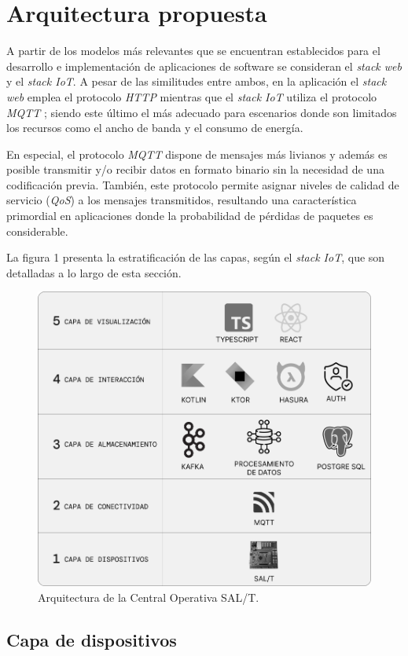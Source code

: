 
\captionsetup[figure]{font=small}


\section{Arquitectura propuesta}

A partir de los modelos más relevantes que se encuentran establecidos para el desarrollo e implementación de aplicaciones de software se consideran el \textit{stack web} y el \textit{stack IoT}. A pesar de las similitudes entre ambos, en la aplicación el \textit{stack web} emplea el protocolo \textit{HTTP} \cite{b5} mientras que el \textit{stack IoT} utiliza el protocolo \textit{MQTT} \cite{b6}; siendo este último el más adecuado para escenarios donde son limitados los recursos como el ancho de banda y el consumo de energía.

En especial, el protocolo \textit{MQTT} dispone de mensajes más livianos y además es posible transmitir y/o recibir datos en formato binario sin la necesidad de una codificación previa. También, este protocolo permite asignar niveles de calidad de servicio (\textit{QoS}) \cite{b7} a los mensajes transmitidos, resultando una característica primordial en aplicaciones donde la probabilidad de pérdidas de paquetes es considerable.

La figura 1 presenta la estratificación de las capas, según el \textit{stack IoT}, que son detalladas a lo largo de esta sección.

\begin{figure}[htp]
  \centering 
  \includegraphics[width=.48\textwidth]{images/v2.1.0/cuadro.jpg}
  \caption{Arquitectura de la Central Operativa SAL/T.}
  \label{fig:diagBloques}
\end{figure}

\subsection{Capa de dispositivos}

